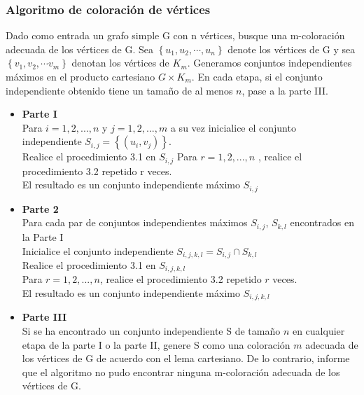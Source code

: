 \documentclass[letterpaper,12pt]{article}
\begin{document}
    \subsubsection{Algoritmo de coloración de vértices }
    Dado como entrada un grafo simple G con n vértices, busque una m-coloración adecuada de los vértices de G. Sea $\left \{ u_{1}, u_{2}, \cdots, u_{n} \right \}$ denote los vértices de G y sea $\left \{ {v_{1}, v_{2}, \cdots v_{m}} \right \}$ denotan los vértices de $K_{m}$. Generamos conjuntos independientes máximos en el producto cartesiano $G \times K_{m}$. En cada etapa, si el conjunto independiente obtenido tiene un tamaño de al menos $n$, pase a la parte III. 
    \begin{itemize}
        \item \textbf{Parte I} \\ 
        Para $ i = 1, 2, ..., n$ y $ j = 1, 2, ..., m$ a su vez inicialice el conjunto independiente $S_{i,j}=\left \{ (u_{i},v_{j}) \right \}$. \\
        Realice el procedimiento 3.1 en $S_{i,j}$
        Para $ r = 1, 2, ..., n$ , realice el procedimiento 3.2 repetido r veces. \\
        El resultado es un conjunto independiente máximo $S_{i,j}$
        \item \textbf{Parte 2} \\
         Para cada par de conjuntos independientes máximos $S_{i,j}$, $S_{k,l}$ encontrados en la Parte I \\
        Inicialice el conjunto independiente $S_{i,j,k,l}=S_{i,j}\cap S_{k,l}$ \\
        Realice el procedimiento 3.1 en $S_{i,j,k,l}$ \\
        Para $r = 1, 2, ..., n$, realice el procedimiento 3.2 repetido $r$ veces. \\
        El resultado es un conjunto independiente máximo $S_{i,j,k,l}$
        \item \textbf{Parte III} \\
        Si se ha encontrado un conjunto independiente S de tamaño $n$ en cualquier etapa de la parte I o la parte II, genere S como una coloración $m$ adecuada de los vértices de G de acuerdo con el lema cartesiano. De lo contrario, informe que el algoritmo no pudo encontrar ninguna m-coloración adecuada de los vértices de G.
    \end{itemize}
\end{document}
